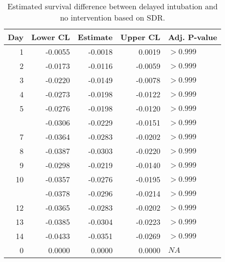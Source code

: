 \begin{table}

\caption{\label{tab:survdiff_sdr}Estimated survival difference between delayed intubation and no intervention based on SDR.}
\centering
\begin{tabular}[t]{rrrrl}
\toprule
Day & Lower CL & Estimate & Upper CL & Adj. P-value\\
\midrule
1 & -0.0055 & -0.0018 & 0.0019 & $>0.999$\\
2 & -0.0173 & -0.0116 & -0.0059 & $>0.999$\\
3 & -0.0220 & -0.0149 & -0.0078 & $>0.999$\\
4 & -0.0273 & -0.0198 & -0.0122 & $>0.999$\\
5 & -0.0276 & -0.0198 & -0.0120 & $>0.999$\\
\addlinespace
6 & -0.0306 & -0.0229 & -0.0151 & $>0.999$\\
7 & -0.0364 & -0.0283 & -0.0202 & $>0.999$\\
8 & -0.0387 & -0.0303 & -0.0220 & $>0.999$\\
9 & -0.0298 & -0.0219 & -0.0140 & $>0.999$\\
10 & -0.0357 & -0.0276 & -0.0195 & $>0.999$\\
\addlinespace
11 & -0.0378 & -0.0296 & -0.0214 & $>0.999$\\
12 & -0.0365 & -0.0283 & -0.0202 & $>0.999$\\
13 & -0.0385 & -0.0304 & -0.0223 & $>0.999$\\
14 & -0.0433 & -0.0351 & -0.0269 & $>0.999$\\
0 & 0.0000 & 0.0000 & 0.0000 & $NA$\\
\bottomrule
\end{tabular}
\end{table}

